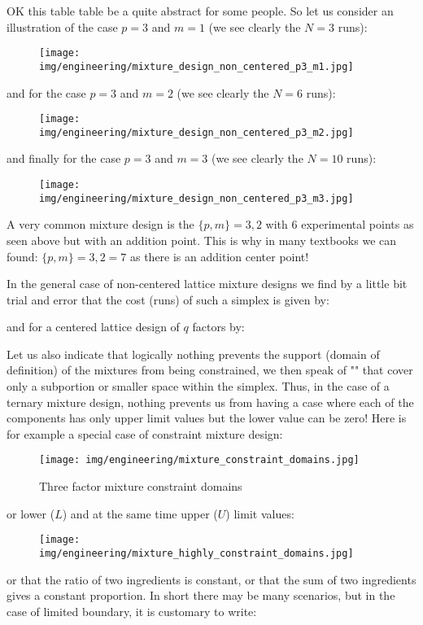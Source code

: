 	OK this table table be a quite abstract for some people. So let us consider an illustration of the case $p=3$ and $m=1$ (we see clearly the $N=3$ runs):
	\begin{figure}[H]
		\centering
		\texttt{[image: img/engineering/mixture\_design\_non\_centered\_p3\_m1.jpg]}
	\end{figure}
	and for the case $p=3$ and $m=2$ (we see clearly the $N=6$ runs):
	\begin{figure}[H]
		\centering
		\texttt{[image: img/engineering/mixture\_design\_non\_centered\_p3\_m2.jpg]}
	\end{figure}
	and finally for the case $p=3$ and $m=3$ (we see clearly the $N=10$ runs):
	\begin{figure}[H]
		\centering
		\texttt{[image: img/engineering/mixture\_design\_non\_centered\_p3\_m3.jpg]}
	\end{figure}
	A very common mixture design is the $\{p,m\}={3,2}$ with $6$ experimental points as seen above but with an addition point. This is why in many textbooks we can found: $\{p,m\}={3,2}=7$ as there is an addition center point!
	
	In the general case of non-centered lattice mixture designs we find by a little bit trial and error that the cost (runs) of such a simplex is given by:
	
	and for a centered lattice design of $q$ factors by:
	
	Let us also indicate that logically nothing prevents the support (domain of definition) of the mixtures from being constrained, we then speak of "" that cover only a subportion or smaller space within the simplex. Thus, in the case of a ternary mixture design, nothing prevents us from having a case where each of the components has only upper limit values but the lower value can be zero! Here is for example a special case of constraint mixture design:
	\begin{figure}[H]
		\centering
		\texttt{[image: img/engineering/mixture\_constraint\_domains.jpg]}
		\caption{Three factor mixture constraint domains}
	\end{figure}
	or lower ($L$) and at the same time upper ($U$) limit values:	
	\begin{figure}[H]
		\centering
		\texttt{[image: img/engineering/mixture\_highly\_constraint\_domains.jpg]}
	\end{figure}
	or that the ratio of two ingredients is constant, or that the sum of two ingredients gives a constant proportion. In short there may be many scenarios, but in the case of limited boundary, it is customary to write:
	
